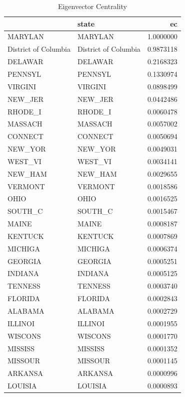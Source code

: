 \documentclass[
  a4paper,
]{article}
\begin{document}
\begin{table}

\caption{\label{tab:unnamed-chunk-15}Eigenvector Centrality}
\centering
\begin{tabular}[t]{l|l|r}
\hline
  & state & ec\\
\hline
MARYLAN & MARYLAN & 1.0000000\\
\hline
District of Columbia & District of Columbia & 0.9873118\\
\hline
DELAWAR & DELAWAR & 0.2168323\\
\hline
PENNSYL & PENNSYL & 0.1330974\\
\hline
VIRGINI & VIRGINI & 0.0898499\\
\hline
NEW\_JER & NEW\_JER & 0.0442486\\
\hline
RHODE\_I & RHODE\_I & 0.0060478\\
\hline
MASSACH & MASSACH & 0.0057002\\
\hline
CONNECT & CONNECT & 0.0050694\\
\hline
NEW\_YOR & NEW\_YOR & 0.0049031\\
\hline
WEST\_VI & WEST\_VI & 0.0034141\\
\hline
NEW\_HAM & NEW\_HAM & 0.0029655\\
\hline
VERMONT & VERMONT & 0.0018586\\
\hline
OHIO & OHIO & 0.0016525\\
\hline
SOUTH\_C & SOUTH\_C & 0.0015467\\
\hline
MAINE & MAINE & 0.0008187\\
\hline
KENTUCK & KENTUCK & 0.0007869\\
\hline
MICHIGA & MICHIGA & 0.0006374\\
\hline
GEORGIA & GEORGIA & 0.0005251\\
\hline
INDIANA & INDIANA & 0.0005125\\
\hline
TENNESS & TENNESS & 0.0003740\\
\hline
FLORIDA & FLORIDA & 0.0002843\\
\hline
ALABAMA & ALABAMA & 0.0002729\\
\hline
ILLINOI & ILLINOI & 0.0001955\\
\hline
WISCONS & WISCONS & 0.0001770\\
\hline
MISSISS & MISSISS & 0.0001352\\
\hline
MISSOUR & MISSOUR & 0.0001145\\
\hline
ARKANSA & ARKANSA & 0.0000996\\
\hline
LOUISIA & LOUISIA & 0.0000893\\

\end{tabular}
\end{table}
\end{document}
